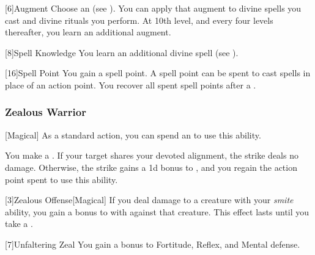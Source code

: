             [6]{Augment}
            Choose an  (see ).
            You can apply that augment to divine spells you cast and divine rituals you perform.
            At 10th level, and every four levels thereafter, you learn an additional augment.

            [8]{Spell Knowledge}
            You learn an additional divine spell (see ).

            [16]{Spell Point} 
            You gain a spell point.
            A spell point can be spent to cast spells in place of an action point.
            You recover all spent spell points after a .

        \subsubsection{Zealous Warrior}
            [Magical] As a standard action, you can spend an  to use this ability.
            \begin{ability}
                \begin{spelleffects}
                    \spelleffect You make a .
                    If your target shares your devoted alignment, the strike deals no damage.
                    Otherwise, the strike gains a \plus1d bonus to , and you regain the action point spent to use this ability.
                \end{spelleffects}
            \end{ability}

            [3]{Zealous Offense}[Magical]
            If you deal damage to a creature with your \textit{smite} ability, you gain a  bonus to  with  against that creature.
            This effect lasts until you take a .

            [7]{Unfaltering Zeal}
            You gain a  bonus to Fortitude, Reflex, and Mental defense.

